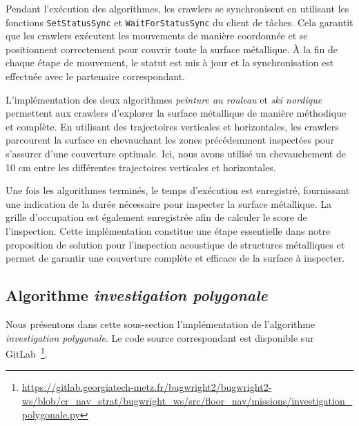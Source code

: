 \documentclass[english,RandD]{rapportPFE}  %
\begin{document}
			Pendant l'exécution des algorithmes, les crawlers se synchronisent en utilisant les fonctions \texttt{SetStatusSync} et \texttt{WaitForStatusSync} du client de tâches.
			Cela garantit que les crawlers exécutent les mouvements de manière coordonnée et se positionnent correctement pour couvrir toute la surface métallique.
			À la fin de chaque étape de mouvement, le statut est mis à jour et la synchronisation est effectuée avec le partenaire correspondant.

			L'implémentation des deux algorithmes \textit{peinture au rouleau} et \textit{ski nordique} permettent aux crawlers d'explorer la surface métallique de manière méthodique et complète.
			En utilisant des trajectoires verticales et horizontales, les crawlers parcourent la surface en chevauchant les zones précédemment inspectées pour s'assurer d'une couverture optimale.
			Ici, nous avons utilisé un chevauchement de 10 cm entre les différentes trajectoires verticales et horizontales.

			Une fois les algorithmes terminés, le temps d'exécution est enregistré, fournissant une indication de la durée nécessaire pour inspecter la surface métallique.
			La grille d'occupation est également enregistrée afin de calculer le score de l'inspection.
			Cette implémentation constitue une étape essentielle dans notre proposition de solution pour l'inspection acoustique de structures métalliques et permet de garantir une couverture complète et efficace de la surface à inspecter.
		\subsection*{Algorithme \textit{investigation polygonale}}
			Nous présentons dans cette sous-section l'implémentation de l'algorithme \textit{investigation polygonale}.
			Le code source correspondant est disponible sur GitLab~\footnote{\url{https://gitlab.georgiatech-metz.fr/bugwright2/bugwright2-ws/blob/cr_nav_strat/bugwright_ws/src/floor_nav/missions/investigation_polygonale.py}}.
\end{document}
